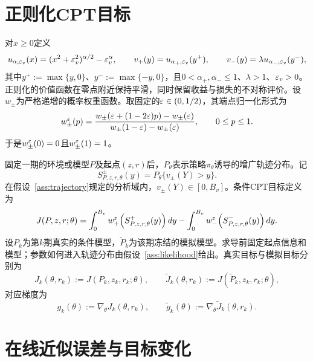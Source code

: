 \section{正则化CPT目标}

对$x\ge0$定义
\begin{equation}\label{eq:value-functions}
 u_{\alpha,\varepsilon_v}(x)=(x^2+\varepsilon_v^2)^{\alpha/2}-\varepsilon_v^\alpha,
 \qquad
 v_+(y)=u_{\alpha_+,\varepsilon_v}(y^+),
 \qquad
 v_-(y)=\lambda u_{\alpha_-,\varepsilon_v}(y^-),
\end{equation}
其中$y^+:=\max\{y,0\}$、$y^-:=\max\{-y,0\}$，且$0<\alpha_+,\alpha_-\le1$、$\lambda>1$、$\varepsilon_v>0$。正则化的价值函数在零点附近保持平滑，同时保留收益与损失的不对称评价。设$w_\pm$为严格递增的概率权重函数。取固定的$\varepsilon\in(0,1/2)$，其端点归一化形式为
\begin{equation}\label{eq:normalized-weight}
 w_\pm^\varepsilon(p)
 =\frac{w_\pm(\varepsilon+(1-2\varepsilon)p)-w_\pm(\varepsilon)}
 {w_\pm(1-\varepsilon)-w_\pm(\varepsilon)},
 \qquad 0\le p\le1.
\end{equation}
于是$w_\pm^\varepsilon(0)=0$且$w_\pm^\varepsilon(1)=1$。

固定一期的环境或模型$P$及起点$(z,r)$后，$P_\theta$表示策略$\pi_\theta$诱导的增广轨迹分布。记
\[
 S_{P,z,r,\theta}^{\pm}(y)
 =P_\theta\{v_\pm(Y)>y\}.
\]
在假设~\ref{ass:trajectory}规定的分析域内，$v_\pm(Y)\in[0,B_v]$。条件CPT目标定义为
\begin{equation}\label{eq:generic-cpt-objective}
 J(P,z,r;\theta)
 =\int_0^{B_v}w_+^\varepsilon\!\left(S_{P,z,r,\theta}^{+}(y)\right)dy
 -\int_0^{B_v}w_-^\varepsilon\!\left(S_{P,z,r,\theta}^{-}(y)\right)dy.
\end{equation}
设$P_k$为第$k$期真实的条件模型，$\widetilde P_k$为该期冻结的模拟模型。求导前固定起点信息和模型；参数如何进入轨迹分布由假设~\ref{ass:likelihood}给出。真实目标与模拟目标分别为
\begin{equation}\label{eq:true-sim-objectives}
 J_k(\theta,r_k):=J(P_k,z_k,r_k;\theta),
 \qquad
 \widetilde J_k(\theta,r_k):=J(\widetilde P_k,z_k,r_k;\theta),
\end{equation}
对应梯度为
\begin{equation}\label{eq:true-sim-gradients}
 g_k(\theta):=\nabla_\theta J_k(\theta,r_k),
 \qquad
 \widetilde g_k(\theta):=\nabla_\theta\widetilde J_k(\theta,r_k).
\end{equation}

\section{在线近似误差与目标变化}

